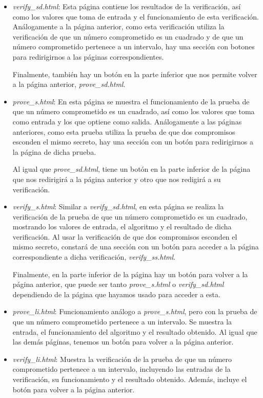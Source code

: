 \begin{itemize}
    \item \emph{verify\_sd.html}: Esta página contiene los resultados de la verificación, así como los valores que toma de entrada y el funcionamiento de esta verificación. Análogamente a la página anterior, como esta verificación utiliza la verificación de que un número comprometido es un cuadrado y de que un número comprometido pertenece a un intervalo, hay una sección con botones para redirigirnos a las páginas correspondientes.

    Finalmente, también hay un botón en la parte inferior que nos permite volver a la página anterior, \emph{prove\_sd.html}.

    \item \emph{prove\_s.html}: En esta página se muestra el funcionamiento de la prueba de que un número comprometido es un cuadrado, así como los valores que toma como entrada y los que optiene como salida. Análogamente a las páginas anteriores, como esta prueba utiliza la prueba de que dos compromisos esconden el mismo secreto, hay una sección con un botón para redirigirnos a la página de dicha prueba.

    Al igual que \emph{prove\_sd.html}, tiene un botón en la parte inferior de la página que nos redirigirá a la página anterior y otro que nos redigirá a su verificación.

    \item \emph{verify\_s.html}: Similar a \emph{verify\_sd.html}, en esta página se realiza la verificación de la prueba de que un número comprometido es un cuadrado, mostrando los valores de entrada, el algoritmo y el resultado de dicha verificación. Al usar la verificación de que dos compromisos esconden el mismo secreto, constará de una sección con un botón para acceder a la página correspondiente a dicha verificación, \emph{verify\_ss.html}.

    Finalmente, en la parte inferior de la página hay un botón para volver a la página anterior, que puede ser tanto \emph{prove\_s.html} o \emph{verify\_sd.html} dependiendo de la página que hayamos usado para acceder a esta.

    \item \emph{prove\_li.html}: Funcionamiento análogo a \emph{prove\_s.html}, pero con la prueba de que un número comprometido pertenece a un intervalo. Se muestra la entrada, el funcionamiento del algoritmo y el resultado obtenido. Al igual que las demás páginas, tenemos un botón para volver a la página anterior.

    \item \emph{verify\_li.html}: Muestra la verificación de la prueba de que un número comprometido pertenece a un intervalo, incluyendo las entradas de la verificación, su funcionamiento y el resultado obtenido. Además, incluye el botón para volver a la página anterior.


\end{itemize}
